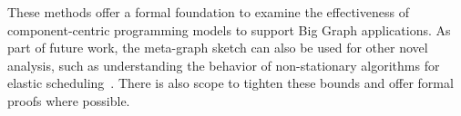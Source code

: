\documentclass[10pt,conference, compsocconf]{IEEEtran}
\begin{document}
These methods offer a formal foundation to examine the effectiveness of component-centric programming models to support Big Graph applications.  As part of future work, the meta-graph sketch can also be used for other novel analysis, such as understanding the behavior of non-stationary algorithms for elastic scheduling~\cite{ccgrid}. There is also scope to tighten these bounds and offer formal proofs where possible. 














\footnotesize{

}
\end{document}
